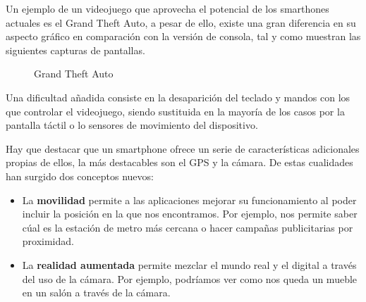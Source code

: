 Un ejemplo de un videojuego que aprovecha el potencial de los smarthones actuales es el Grand Theft Auto, a pesar de ello, existe una gran diferencia en su aspecto gráfico en comparación con la versión de consola, tal y como muestran las siguientes capturas de pantallas.

\begin{figure}[h]
	\centerfloat	 
	\caption{Grand Theft Auto}
\end{figure}

Una dificultad añadida consiste en la desaparición del teclado y mandos con los que controlar el videojuego, siendo sustituida en la mayoría de los casos por la pantalla táctil o lo sensores de movimiento del dispositivo. 
\newline

Hay que destacar que un smartphone ofrece un serie de características adicionales propias de ellos, la más destacables son el GPS y la cámara. De estas cualidades han surgido dos conceptos nuevos:
\begin{itemize}
\item La \textbf{movilidad} permite a las aplicaciones mejorar su funcionamiento al poder incluir la posición en la que nos encontramos. Por ejemplo, nos permite saber cúal es la estación de metro más cercana o hacer campañas publicitarias por proximidad.
\item La \textbf{realidad aumentada} permite mezclar el mundo real y el digital a través del uso de la cámara. Por ejemplo, podríamos ver como nos queda un mueble en un salón a través de la cámara.
\end{itemize}

